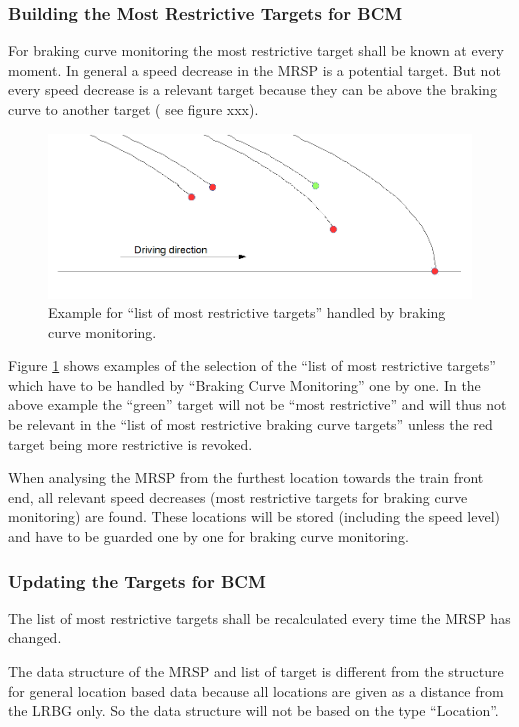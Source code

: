 \subsubsection{Building the Most Restrictive Targets for BCM}
For braking curve monitoring the most restrictive target shall be known at every moment. In general a speed decrease in the MRSP is a potential target.  But not every speed decrease is a relevant target because they can be above the braking curve to another target ( see figure xxx). 


\begin{figure}[ht]
\centering
\includegraphics[scale=0.6]{../images/ExampleListOfMostRestrictiveTarget.png}
\caption{Example for ``list of most restrictive targets'' handled by braking curve monitoring.}\label{fig:ExampleListOfTargets}
\end{figure}


Figure \ref{fig:ExampleListOfTargets} shows examples of the selection of the “list of most restrictive targets” which have to be handled by “Braking Curve Monitoring” one by one. In the above example the “green” target will not be “most restrictive” and will thus not be relevant in the “list of most restrictive braking curve targets” unless the red target being more restrictive is revoked.

When analysing the MRSP from the furthest location towards the train front end, all relevant speed decreases (most restrictive targets for braking curve monitoring) are found. These locations will be stored (including the speed level) and have to be guarded one by one for braking curve monitoring.

\subsubsection{Updating the Targets for BCM}
The list of most restrictive targets shall be recalculated every time the MRSP has changed.

The data structure of the MRSP and list of target is different from the structure for general location based data because all locations are given as a distance from the LRBG only. So the data structure will not be based on the type “Location”.